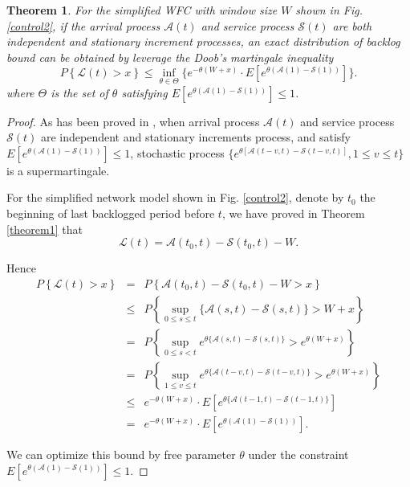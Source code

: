 \documentclass[12pt]{article}
\newtheorem{theorem}{Theorem}
\newtheorem{proof}{Proof}
\def \QED {\hfill \vrule height6pt width 6pt depth 0pt}
\begin{document}
\begin{theorem}\label{theorem3}
For the simplified WFC with window size $W$ shown in Fig. \ref{control2}, if the arrival process $\mathcal{A}(t)$ and service process $\mathcal{S}(t)$ are both independent and stationary increment processes, an exact distribution of backlog bound can be obtained by leverage the Doob's martingale inequality
\begin{equation}\label{eqn3}
P\left\{\mathcal{L}(t)>x\right\}\leq \inf_{\theta\in\Theta}\{e^{-\theta(W+x)}\cdot E[e^{\theta(\mathcal{A}(1)-\mathcal{S}(1))}]\}.
\end{equation}
where $\Theta$ is the set of $\theta$ satisfying $E[e^{\theta(\mathcal{A}(1)-\mathcal{S}(1))}]\leq 1$.
\end{theorem}
\begin{proof}
As has been proved in \cite{jiang2009network,Ciucu2007Network}, when arrival process $\mathcal{A}(t)$ and service process $\mathcal{S}(t)$ are independent and stationary increments process, and satisfy $E[e^{\theta(\mathcal{A}(1)-\mathcal{S}(1))}]\leq 1$, stochastic process $\{e^{\theta[\mathcal{A}(t-v,t)-\mathcal{S}(t-v,t)]},1\leq v\leq t\}$ is a supermartingale.

For the simplified network model shown in Fig. \ref{control2}, denote by $t_{0}$ the beginning of last backlogged period before $t$, we have proved in Theorem \ref{theorem1} that
$$\mathcal{L}(t)=\mathcal{A}(t_0,t)-\mathcal{S}(t_0,t)-W.$$

Hence
\begin{eqnarray*}
P\left\{\mathcal{L}(t)>x\right\}  &=&P\left\{\mathcal{A}(t_{0},t)-\mathcal{S}(t_{0},t)-W>x\right\}\\
  &\leq& P\left\{\sup_{0\leq s\leq t}\{\mathcal{A}(s,t)-\mathcal{S}(s,t)\}>W+x\right\}\\
  &=& P\left\{\sup_{0\leq s< t}e^{\theta\{\mathcal{A}(s,t)-\mathcal{S}(s,t)\}}>e^{\theta(W+x)}\right\}\\
  &=& P\left\{\sup_{1\leq v\leq t}e^{\theta\{\mathcal{A}(t-v,t)-\mathcal{S}(t-v,t)\}}>e^{\theta(W+x)}\right\}\\
  &\leq& e^{-\theta(W+x)}\cdot E[e^{\theta\{\mathcal{A}(t-1,t)-\mathcal{S}(t-1,t)\}}]\\
  &=& e^{-\theta(W+x)}\cdot E[e^{\theta(\mathcal{A}(1)-\mathcal{S}(1))}].
\end{eqnarray*}

We can optimize this bound by free parameter $\theta$ under the constraint $E[e^{\theta(\mathcal{A}(1)-\mathcal{S}(1))}]\leq 1$.\QED
\end{proof}
\end{document}
